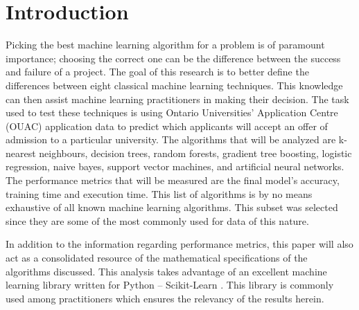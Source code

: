\chapter{Introduction}
Picking the best machine learning algorithm for a problem is of paramount importance; choosing the correct one can be the difference between the success and failure of a project. The goal of this research is to better define the differences between eight classical machine learning techniques. This knowledge can then assist machine learning practitioners in making their decision. The task used to test these techniques is using Ontario Universities' Application Centre (OUAC) application data to predict which applicants will accept an offer of admission to a particular university. The algorithms that will be analyzed are k-nearest neighbours, decision trees, random forests, gradient tree boosting, logistic regression, naive bayes, support vector machines, and artificial neural networks. The performance metrics that will be measured are the final model's accuracy, training time and execution time. This list of algorithms is by no means exhaustive of all known machine learning algorithms. This subset was selected since they are some of the most commonly used for data of this nature.

In addition to the information regarding performance metrics, this paper will also act as a consolidated resource of the mathematical specifications of the algorithms discussed. This analysis takes advantage of an excellent machine learning library written for Python -- Scikit-Learn \cite{scikit-learn}. This library is commonly used among practitioners which ensures the relevancy of the results herein.